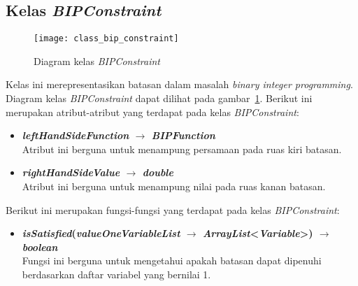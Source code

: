 \subsection{Kelas \textit{BIPConstraint}}
\begin{figure}[H]
	\centering  
	\texttt{[image: class\_bip\_constraint]}
	\caption[Diagram kelas \textit{BIPConstraint}]{Diagram kelas \textit{BIPConstraint}}
	\label{fig:class_bip_constraint}
\end{figure}
Kelas ini merepresentasikan batasan dalam masalah \textit{binary integer programming}. Diagram kelas \textit{BIPConstraint} dapat dilihat pada gambar~\ref{fig:class_bip_constraint}. Berikut ini merupakan atribut-atribut yang terdapat pada kelas \textit{BIPConstraint}:
\begin{itemize}
	\item \textbf{\textit{leftHandSideFunction} $\rightarrow$ \textit{BIPFunction}}\\
	Atribut ini berguna untuk menampung persamaan pada ruas kiri batasan.
	\item \textbf{\textit{rightHandSideValue} $\rightarrow$ \textit{double}}\\
	Atribut ini berguna untuk menampung nilai pada ruas kanan batasan.
\end{itemize}
Berikut ini merupakan fungsi-fungsi yang terdapat pada kelas \textit{BIPConstraint}:
\begin{itemize}
	\item \textbf{\textit{isSatisfied}(\textit{valueOneVariableList} $\rightarrow$ \textit{ArrayList}<\textit{Variable}>) $\rightarrow$ \textit{boolean}}\\
	Fungsi ini berguna untuk mengetahui apakah batasan dapat dipenuhi berdasarkan daftar variabel yang bernilai 1.
\end{itemize}

